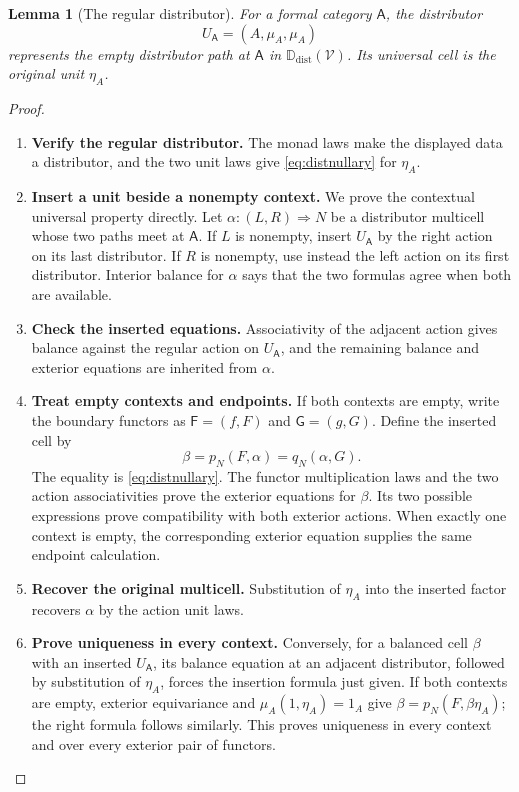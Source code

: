 \documentclass[11pt,reqno]{amsart}
\theoremstyle{plain}
\newtheorem{lemma}[theorem]{Lemma}
\theoremstyle{definition}
\theoremstyle{remark}
\numberwithin{equation}{section}
\newcommand{\V}{\mathcal V}
\newcommand{\Ddist}{\mathbb D_{\mathrm{dist}}}
\newcommand{\cell}{\mathrel{\Longrightarrow}}
\begin{document}
\begin{lemma}[The regular distributor]\label{lem:distunit}
For a formal category $\mathsf A$, the distributor
\[
 U_{\mathsf A}=(A,\mu_A,\mu_A)
\]
represents the empty distributor path at $\mathsf A$ in $\Ddist(\V)$.
Its universal cell is the original unit $\eta_A$.
\end{lemma}
\begin{proof}\leavevmode
\begin{enumerate}
\item \textbf{Verify the regular distributor.} The monad laws make the displayed data a distributor, and the two unit
laws give \cref{eq:distnullary} for $\eta_A$.

\item \textbf{Insert a unit beside a nonempty context.} We prove the contextual
universal property directly. Let $\alpha:(L,R)\cell N$ be a
distributor multicell whose two paths meet at $\mathsf A$. If $L$ is
nonempty, insert $U_{\mathsf A}$ by the right action on its last
distributor. If $R$ is nonempty, use instead the left action on its first
distributor. Interior balance for $\alpha$ says that the two formulas
agree when both are available.

\item \textbf{Check the inserted equations.} Associativity of the adjacent action
gives balance against the regular action on $U_{\mathsf A}$, and the
remaining balance and exterior equations are inherited from $\alpha$.

\item \textbf{Treat empty contexts and endpoints.} If both contexts are empty, write the boundary functors as
$\mathsf F=(f,F)$ and $\mathsf G=(g,G)$. Define the inserted cell by
\[
 \beta=p_N(F,\alpha)=q_N(\alpha,G).
\]
The equality is \cref{eq:distnullary}. The functor multiplication laws
and the two action associativities prove the exterior equations for
$\beta$. Its two possible expressions prove compatibility with both
exterior actions. When exactly one context is empty, the corresponding
exterior equation supplies the same endpoint calculation.

\item \textbf{Recover the original multicell.} Substitution of $\eta_A$ into the inserted factor recovers $\alpha$
by the action unit laws.

\item \textbf{Prove uniqueness in every context.} Conversely, for a balanced cell $\beta$ with
an inserted $U_{\mathsf A}$, its balance equation at an adjacent
distributor, followed by substitution of $\eta_A$, forces the insertion
formula just given. If both contexts are empty, exterior equivariance
and $\mu_A(1,\eta_A)=1_A$ give
$\beta=p_N(F,\beta\eta_A)$; the right formula follows similarly.
This proves uniqueness in every context and over every exterior pair
of functors.\qedhere
\end{enumerate}
\end{proof}
\end{document}
